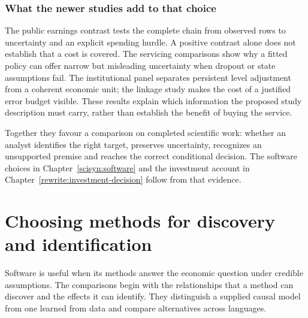\section{What the newer studies add to that choice}
The public earnings contrast tests the complete chain from observed rows to
uncertainty and an explicit spending hurdle. A positive contrast alone does
not establish that a cost is covered. The servicing comparisons show why a
fitted policy can offer narrow but misleading uncertainty when dropout or
state assumptions fail. The institutional panel separates persistent level
adjustment from a coherent economic unit; the linkage study makes the cost
of a justified error budget visible. These results explain which information
the proposed study description must carry, rather than establish the benefit
of buying the service.

Together they favour a comparison on completed scientific work: whether an
analyst identifies the right target, preserves uncertainty, recognizes an
unsupported premise and reaches the correct conditional decision. The
software choices in Chapter~\ref{scisyn:software} and the investment account
in Chapter~\ref{rewrite:investment-decision} follow from that evidence.



\part{Choosing methods for discovery and identification}
\label{reading:part-methods}
Software is useful when its methods answer the economic question under
credible assumptions. The comparisons begin with the relationships that a
method can discover and the effects it can identify. They distinguish a supplied
causal model from one learned from data and compare alternatives across languages.


